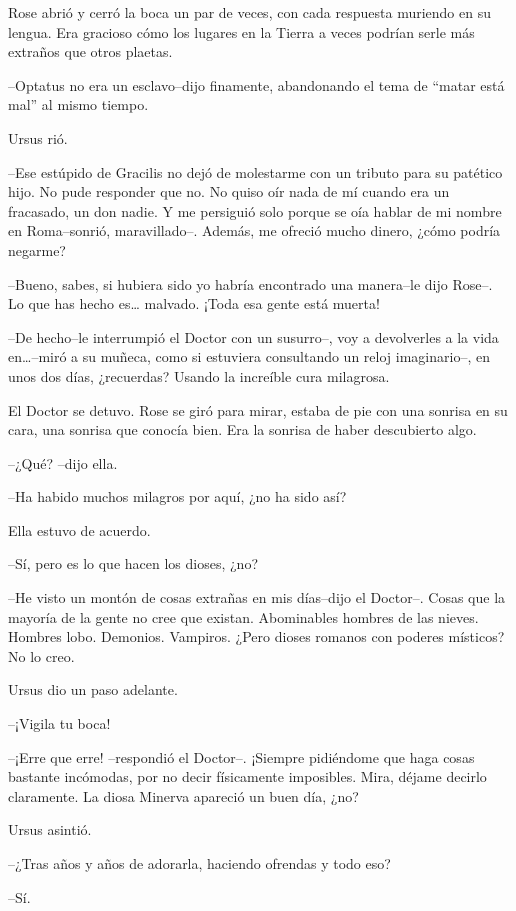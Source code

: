 Rose abrió y cerró la boca un par de veces, con cada respuesta muriendo
en su lengua. Era gracioso cómo los lugares en la Tierra a veces podrían
serle más extraños que otros plaetas.

--Optatus no era un esclavo--dijo finamente, abandonando el tema de
``matar está mal'' al mismo tiempo.

Ursus rió.

--Ese estúpido de Gracilis no dejó de molestarme con un tributo para su
patético hijo. No pude responder que no. No quiso oír nada de mí cuando
era un fracasado, un don nadie. Y me persiguió solo porque se oía hablar
de mi nombre en Roma--sonrió, maravillado--. Además, me ofreció mucho
dinero, ¿cómo podría negarme?

--Bueno, sabes, si hubiera sido yo habría encontrado una manera--le dijo
Rose--. Lo que has hecho es\ldots{} malvado. ¡Toda esa gente está
muerta!

--De hecho--le interrumpió el Doctor con un susurro--, voy a devolverles
a la vida en\ldots{}--miró a su muñeca, como si estuviera consultando un
reloj imaginario--, en unos dos días, ¿recuerdas? Usando la increíble
cura milagrosa.

El Doctor se detuvo. Rose se giró para mirar, estaba de pie con una
sonrisa en su cara, una sonrisa que conocía bien. Era la sonrisa de
haber descubierto algo.

--¿Qué? --dijo ella.

--Ha habido muchos milagros por aquí, ¿no ha sido así?

Ella estuvo de acuerdo.

--Sí, pero es lo que hacen los dioses, ¿no?

--He visto un montón de cosas extrañas en mis días--dijo el Doctor--.
Cosas que la mayoría de la gente no cree que existan. Abominables
hombres de las nieves. Hombres lobo. Demonios. Vampiros. ¿Pero dioses
romanos con poderes místicos? No lo creo.

Ursus dio un paso adelante.

--¡Vigila tu boca!

--¡Erre que erre! --respondió el Doctor--. ¡Siempre pidiéndome que haga
cosas bastante incómodas, por no decir físicamente imposibles. Mira,
déjame decirlo claramente. La diosa Minerva apareció un buen día, ¿no?

Ursus asintió.

--¿Tras años y años de adorarla, haciendo ofrendas y todo eso?

--Sí.

